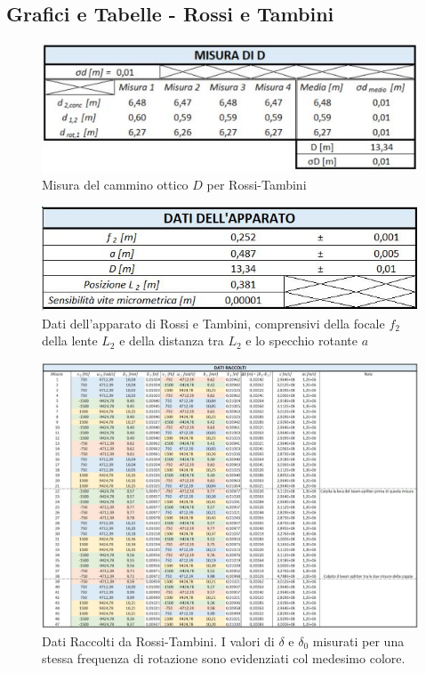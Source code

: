 \documentclass{article}
\begin{document}
\subsection{Grafici e Tabelle - Rossi e Tambini} \label{RT}

\begin{figure}[h]
    \centering
    \includegraphics[width=0.5\linewidth]{RT_D.JPG}
    \caption{Misura del cammino ottico $D$ per Rossi-Tambini}
    \label{RT_D}
\end{figure}

\begin{figure}[h]
    \centering
    \includegraphics[width=0.6\linewidth]{RT_Apparato.JPG}
    \caption{Dati dell'apparato di Rossi e Tambini, comprensivi della focale $f_2$ della lente $L_2$ e della distanza tra $L_2$ e lo specchio rotante $a$}
    \label{RT_Apparato}
\end{figure}

\begin{figure}[h!]
    \centering
    \includegraphics[width=1.02\linewidth]{RT_DatiRaccolti.JPG}
    \caption{Dati Raccolti da Rossi-Tambini. I valori di $\delta$ e $\delta_0$ misurati per una stessa frequenza di rotazione sono evidenziati col medesimo colore.}
    \label{RT_DatiRaccolti}
\end{figure}
\end{document}

